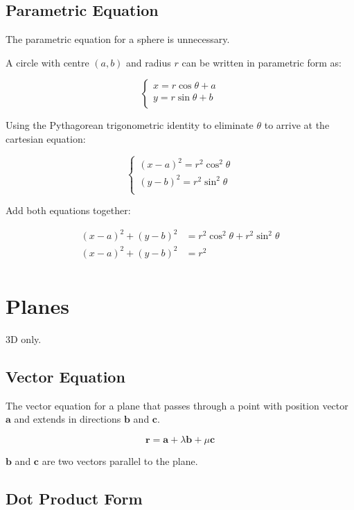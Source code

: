 \documentclass[a4paper,11pt]{article}
\newcommand{\bb}{\boldsymbol}
\begin{document}
\subsection{Parametric Equation}

The parametric equation for a sphere is unnecessary.

A circle with centre $(a, b)$ and radius $r$ can be written in parametric form
as:

$$
\begin{cases}
x = r \cos{\theta} + a \\
y = r \sin{\theta} + b \\
\end{cases}
$$

Using the Pythagorean trigonometric identity to eliminate $\theta$ to arrive at
the cartesian equation:

$$
\begin{cases}
(x - a)^2 = r^2 \cos^2{\theta} \\
(y - b)^2 = r^2 \sin^2{\theta} \\
\end{cases}
$$

Add both equations together:

$$
\begin{aligned}
(x - a)^2 + (y - b)^2 & = r^2 \cos^2{\theta} + r^2 \sin^2{\theta} \\
(x - a)^2 + (y - b)^2 & = r^2 \\
\end{aligned}
$$




\section{Planes}

3D only.


\subsection{Vector Equation}

The vector equation for a plane that passes through a point with position
vector $\bb{a}$ and extends in directions $\bb{b}$ and $\bb{c}$.

$$
\bb{r} = \bb{a} + \lambda \bb{b} + \mu \bb{c}
$$

$\bb{b}$ and $\bb{c}$ are two vectors parallel to the plane.


\subsection{Dot Product Form}
\end{document}
